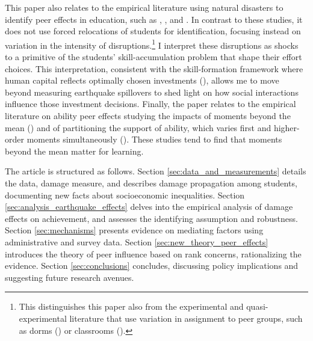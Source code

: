 This paper also relates to the empirical literature using natural disasters to identify peer effects in education, such as \cite{cipollone2007social}, \cite{sacerdote2008saints}, and \cite{ imberman2012katrina}. In contrast to these studies, it does not use forced relocations of students for identification, focusing instead on variation in the intensity of disruptions.\footnote{This distinguishes this paper also from the experimental and quasi-experimental literature that use variation in assignment to peer groups, such as dorms (\cite{sacerdote2001peer,zimmerman2003peer,Stinebrickner2006,kremer2008peer,garlick2018academic}) or classrooms (\cite{duflo2011peer,whitmore2005resource,kang2007classroom}).} I interpret these disruptions as shocks to a primitive of the students' skill-accumulation problem that shape their effort choices. This interpretation, consistent with the skill-formation framework where human capital reflects optimally chosen investments (\cite{todd2003specification,cunha2008formulating,cunha2010estimating}), allows me to move beyond measuring earthquake spillovers to shed light on how social interactions influence those investment decisions. Finally, the paper relates to the empirical literature on ability peer effects studying the impacts of moments beyond the mean (\cite{lyle2009effects,booij2017ability,ding2007peers,vigdor2007peer, hoxby2005taking}) and of partitioning the support of ability, which varies first and higher-order moments simultaneously (\cite{carrell2013natural,duflo2011peer}). These studies tend to find that moments beyond the mean matter for learning. \par 




The article is structured as follows. Section \ref{sec:data_and_measurements} details the data, damage measure, and describes damage propagation among students, documenting new facts about socioeconomic inequalities. Section  \ref{sec:analysis_earthquake_effects} delves into the empirical analysis of damage effects on achievement, and assesses the identifying assumption and robustness. Section \ref{sec:mechanisms} presents evidence on mediating factors using administrative and survey data. Section \ref{sec:new_theory_peer_effects} introduces the theory of peer influence based on rank concerns, rationalizing the evidence. Section \ref{sec:conclusions} concludes, discussing policy implications and suggesting future research avenues. \par 
